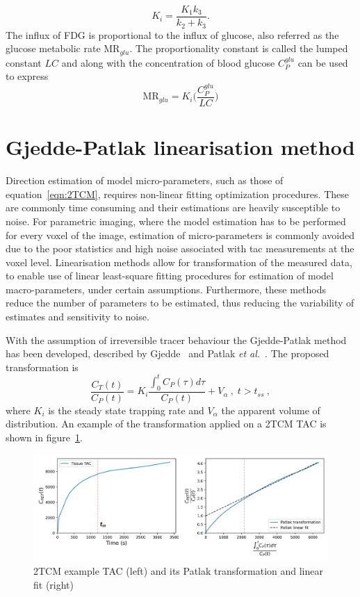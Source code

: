 %
\begin{equation}
K_i = \frac{K_1 k_3}{k_2+k_3} . 
\label{eqn:FDG_Ki}
\end{equation}
%
The influx of FDG is proportional to the influx of glucose, also referred as the glucose metabolic rate $\textrm{MR}_{glu}$. The proportionality constant is called the lumped constant $LC$ and along with the concentration of blood glucose $C_{P}^{glu}$ can be used to express
\begin{equation}
\textrm{MR}_{glu} = K_i \Big(\frac{C_{P}^{glu}}{LC}\Big)
\label{eqn:MR_glu}
\end{equation}
%

\section{Gjedde-Patlak linearisation method}
Direction estimation of model micro-parameters, such as those of equation~\ref{eqn:2TCM}, requires non-linear fitting optimization procedures. These are commonly time consuming and their estimations are heavily susceptible to noise.
For parametric imaging, where the model estimation has to be performed for every voxel of the image, estimation of micro-parameters is commonly avoided due to the poor statistics and high noise associated with \gls{tac} measurements at the voxel level. 
Linearisation methods allow for transformation of the measured data, to enable use of linear least-square fitting procedures for estimation of model macro-parameters, under certain assumptions. Furthermore, these methods reduce the number of parameters to be estimated, thus reducing the variability of estimates and sensitivity to noise. 

With the assumption of irreversible tracer behaviour the Gjedde-Patlak method has been developed, described by Gjedde~\cite{Gjedde1982} and Patlak \textit{et al.}~\cite{Patlak1985}. The proposed transformation is
%
\begin{equation}
\label{eqn:PatlakModel}
\frac{C_{T}(t)}{C_{P}(t)} = K_i \frac{\int_{0}^{t} C_{P}(\tau) d\tau}{ C_{P}(t)} + V_{\alpha}   \ , \;  t>t_{ss} \ ,
\end{equation}
%
where $K_i$ is the steady state trapping rate and $V_{\alpha}$ the apparent volume of distribution.
An example of the transformation applied on a 2TCM TAC is shown in figure~\ref{fig:2TCM_Patlak_Example}.
\begin{figure}[ht!]
	\includegraphics[width=1\textwidth]{2_Theory_Methods/figures/ExamplePatlak.png}
	\centering
	\caption{2TCM example TAC (left) and its Patlak transformation and linear fit (right)}
	\centering
	\label{fig:2TCM_Patlak_Example}
\end{figure}

